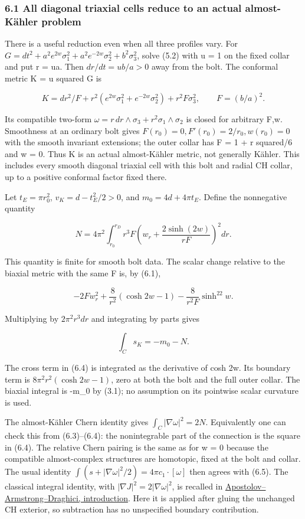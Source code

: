 \documentclass[
  10pt,
]{article}
\begin{document}
\hypertarget{all-diagonal-triaxial-cells-reduce-to-an-actual-almost-kuxe4hler-problem}{%
\subsubsection{6.1 All diagonal triaxial cells reduce to an actual
almost-Kähler
problem}\label{all-diagonal-triaxial-cells-reduce-to-an-actual-almost-kuxe4hler-problem}}

There is a useful reduction even when all three profiles vary. For
\(G=dt^2+a^2e^{2w}\sigma_1^2+a^2e^{-2w}\sigma_2^2+b^2\sigma_3^2\), solve
(5.2) with u = 1 on the fixed collar and put r = ua. Then
\(dr/dt=ub/a>0\) away from the bolt. The conformal metric K = u squared
G is

\[
 K=dr^2/F+r^2(e^{2w}\sigma_1^2+e^{-2w}\sigma_2^2)+r^2F\sigma_3^2,
 \qquad F=(b/a)^2.                                         \tag{6.3}
\]

Its compatible two-form
\(\omega=r\,dr\wedge\sigma_3+r^2\sigma_1\wedge\sigma_2\) is closed for
arbitrary F,w. Smoothness at an ordinary bolt gives
\(F(r_0)=0,F'(r_0)=2/r_0,w(r_0)=0\) with the smooth invariant
extensions; the outer collar has F = 1 + r squared/6 and w = 0. Thus K
is an actual almost-Kähler metric, not generally Kähler. This includes
every smooth diagonal triaxial cell with this bolt and radial CH collar,
up to a positive conformal factor fixed there.

Let \(t_E=\pi r_0^2\), \(v_K=d-t_E^2/2>0\), and \(m_0=4d+4\pi t_E\).
Define the nonnegative quantity

\[
 N=4\pi^2\int_{r_0}^{r_D}r^3F
       \left(w_r+\frac{2\sinh(2w)}{rF}\right)^2dr.          \tag{6.4}
\]

This quantity is finite for smooth bolt data. The scalar change relative
to the biaxial metric with the same F is, by (6.1),

\[
 -2F w_r^2+\frac8{r^2}(\cosh2w-1)
                  -\frac8{r^2F}\sinh^22w.
\]

Multiplying by \(2\pi^2r^3dr\) and integrating by parts gives

\[
                       \int_C s_K=-m_0-N.                 \tag{6.5}
\]

The cross term in (6.4) is integrated as the derivative of cosh 2w. Its
boundary term is \(8\pi^2r^2(\cosh2w-1)\), zero at both the bolt and the
full outer collar. The biaxial integral is -m\_0 by (3.1); no assumption
on its pointwise scalar curvature is used.

The almost-Kähler Chern identity gives \(\int_C|\nabla\omega|^2=2N\).
Equivalently one can check this from (6.3)--(6.4): the nonintegrable
part of the connection is the square in (6.4). The relative Chern
pairing is the same as for w = 0 because the compatible almost-complex
structures are homotopic, fixed at the bolt and collar. The usual
identity \(\int(s+|\nabla\omega|^2/2)=4\pi c_1\cdot[\omega]\) then
agrees with (6.5). The classical integral identity, with
\(|\nabla J|^2=2|\nabla\omega|^2\), is recalled in
\href{https://faculty.fiu.edu/~draghici/research/paperfiles/Math-Ann.pdf}{Apostolov--Armstrong--Draghici,
introduction}. Here it is applied after gluing the unchanged CH
exterior, so subtraction has no unspecified boundary contribution.
\end{document}
